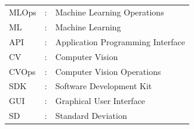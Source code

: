\documentclass[12pt,a4paper]{report}     %
\begin{document}
\tableofcontents	 								%
\newpage
{\setlength{\baselineskip}{1.1\baselineskip}        %
\listoffigures
{}   %
}
\newpage
{\setlength{\baselineskip}{1.1\baselineskip}        %
\listoftables
{}
}
\newpage
		\begin{LARGE}
			\begin{flushleft}
				\section*{}
			\end{flushleft}
		\end{LARGE}
\begin{normalsize}
					\noindent
{\setlength{\baselineskip}{1.1\baselineskip}
\vspace{0.2 in}
\begin{tabular}{lll}
\vspace{0.1 in}
MLOps	&	:	&	Machine Learning Operations	\\
\vspace{0.1 in}
ML	&	:	&	Machine Learning	\\
\vspace{0.1 in}
API	&	:	&	Application Programming Interface	\\
\vspace{0.1 in}
CV	&	:	&	Computer Vision\\
\vspace{0.1 in}
CVOps	&	:	&	Computer Vision Operations\\
\vspace{0.1 in}
SDK	&	:	&	Software Development Kit\\
\vspace{0.1 in}
GUI	&	:	&	Graphical User Interface\\
\vspace{0.1 in}
SD	&	:	&	Standard Deviation\\
\end{tabular}
\par}
\end{normalsize}

\newpage
\pagestyle{fancy}							%
\renewcommand{\headrulewidth}{0.5pt}
\fancyhead[LO]	{}											 %
\renewcommand{\footrulewidth}{0.5pt}		%
\end{document}
